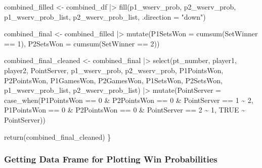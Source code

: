 \documentclass[
  letterpaper,
  DIV=11,
  numbers=noendperiod]{scrartcl}
\newenvironment{Shaded}{\begin{snugshade}}{\end{snugshade}}
\newcommand{\AttributeTok}[1]{\textcolor[rgb]{0.40,0.45,0.13}{#1}}
\newcommand{\ConstantTok}[1]{\textcolor[rgb]{0.56,0.35,0.01}{#1}}
\newcommand{\DecValTok}[1]{\textcolor[rgb]{0.68,0.00,0.00}{#1}}
\newcommand{\FunctionTok}[1]{\textcolor[rgb]{0.28,0.35,0.67}{#1}}
\newcommand{\NormalTok}[1]{\textcolor[rgb]{0.00,0.23,0.31}{#1}}
\newcommand{\OtherTok}[1]{\textcolor[rgb]{0.00,0.23,0.31}{#1}}
\newcommand{\SpecialCharTok}[1]{\textcolor[rgb]{0.37,0.37,0.37}{#1}}
\newcommand{\StringTok}[1]{\textcolor[rgb]{0.13,0.47,0.30}{#1}}
\begin{document}
\begin{Shaded}
\begin{Highlighting}[]
\NormalTok{  combined\_filled }\OtherTok{\textless{}{-}}\NormalTok{ combined\_df }\SpecialCharTok{|\textgreater{}}
    \FunctionTok{fill}\NormalTok{(p1\_wserv\_prob, p2\_wserv\_prob,}
\NormalTok{         p1\_wserv\_prob\_list, p2\_wserv\_prob\_list,}
         \AttributeTok{.direction =} \StringTok{"down"}\NormalTok{)}
  
\NormalTok{  combined\_final }\OtherTok{\textless{}{-}}\NormalTok{ combined\_filled }\SpecialCharTok{|\textgreater{}}
    \FunctionTok{mutate}\NormalTok{(}\AttributeTok{P1SetsWon =} \FunctionTok{cumsum}\NormalTok{(SetWinner }\SpecialCharTok{==} \DecValTok{1}\NormalTok{),}
           \AttributeTok{P2SetsWon =} \FunctionTok{cumsum}\NormalTok{(SetWinner }\SpecialCharTok{==} \DecValTok{2}\NormalTok{))}

\NormalTok{  combined\_final\_cleaned }\OtherTok{\textless{}{-}}\NormalTok{ combined\_final }\SpecialCharTok{|\textgreater{}}
    \FunctionTok{select}\NormalTok{(pt\_number, player1, player2, PointServer, p1\_wserv\_prob, p2\_wserv\_prob,}
\NormalTok{           P1PointsWon, P2PointsWon, P1GamesWon, P2GamesWon, P1SetsWon, P2SetsWon,}
\NormalTok{           p1\_wserv\_prob\_list, p2\_wserv\_prob\_list) }\SpecialCharTok{|\textgreater{}}
    \FunctionTok{mutate}\NormalTok{(}\AttributeTok{PointServer =} \FunctionTok{case\_when}\NormalTok{(P1PointsWon }\SpecialCharTok{==} \DecValTok{0} \SpecialCharTok{\&} 
\NormalTok{                                     P2PointsWon }\SpecialCharTok{==} \DecValTok{0} \SpecialCharTok{\&} 
\NormalTok{                                     PointServer }\SpecialCharTok{==} \DecValTok{1} \SpecialCharTok{\textasciitilde{}} \DecValTok{2}\NormalTok{,}
\NormalTok{                                   P1PointsWon }\SpecialCharTok{==} \DecValTok{0} \SpecialCharTok{\&} 
\NormalTok{                                     P2PointsWon }\SpecialCharTok{==} \DecValTok{0} \SpecialCharTok{\&} 
\NormalTok{                                     PointServer }\SpecialCharTok{==} \DecValTok{2} \SpecialCharTok{\textasciitilde{}} \DecValTok{1}\NormalTok{,}
                                   \ConstantTok{TRUE} \SpecialCharTok{\textasciitilde{}}\NormalTok{ PointServer))}
  
  \FunctionTok{return}\NormalTok{(combined\_final\_cleaned)}
\NormalTok{\}}
\end{Highlighting}
\end{Shaded}

\linespread{2}

\subsubsection{Getting Data Frame for Plotting Win
Probabilities}\label{getting-data-frame-for-plotting-win-probabilities}
\end{document}
